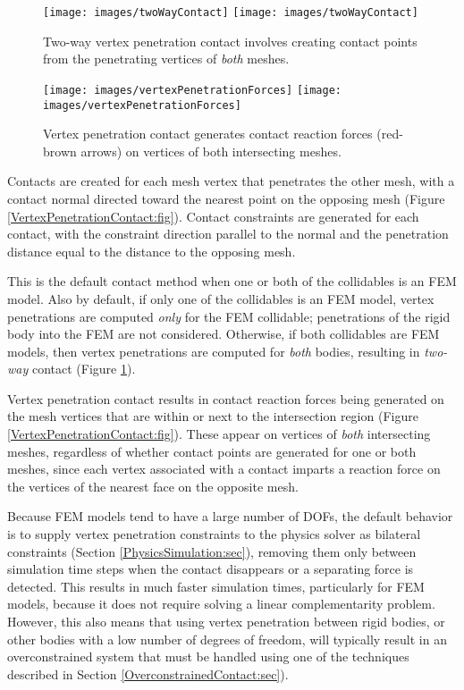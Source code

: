 \begin{figure}[ht]
\begin{center}
\iflatexml
 \texttt{[image: images/twoWayContact]}
\else
 \texttt{[image: images/twoWayContact]}
\fi
\end{center}
\caption{Two-way vertex penetration contact involves creating
contact points from the penetrating vertices of {\it both}
meshes.}
\label{TwoWayContact:fig}
\end{figure}

\begin{figure}[ht]
\begin{center}
\iflatexml
 \texttt{[image: images/vertexPenetrationForces]}
\else
 \texttt{[image: images/vertexPenetrationForces]}
\fi
\end{center}
\caption{Vertex penetration contact generates contact reaction forces
(red-brown arrows) on vertices of both intersecting meshes.}
\label{VertexPenetrationForces:fig}
\end{figure}

Contacts are created for each mesh vertex that penetrates the other
mesh, with a contact normal directed toward the nearest point on the
opposing mesh (Figure \ref{VertexPenetrationContact:fig}).  Contact
constraints are generated for each contact, with the constraint
direction parallel to the normal and the penetration distance equal to
the distance to the opposing mesh.

This is the default contact method when one or both of the
collidables is an FEM model. Also by default, if only one of the
collidables is an FEM model, vertex penetrations are computed {\it
only} for the FEM collidable; penetrations of the rigid body into the
FEM are not considered. Otherwise, if both collidables are FEM models,
then vertex penetrations are computed for {\it both} bodies, resulting
in {\it two-way} contact (Figure \ref{TwoWayContact:fig}).

Vertex penetration contact results in contact reaction forces being generated
on the mesh vertices that are within or next to the intersection region
(Figure \ref{VertexPenetrationContact:fig}).  These appear on vertices of {\it
both} intersecting meshes, regardless of whether contact points are generated
for one or both meshes, since each vertex associated with a contact imparts a
reaction force on the vertices of the nearest face on the opposite mesh.

Because FEM models tend to have a large number of DOFs, the default
behavior is to supply vertex penetration constraints to the physics
solver as bilateral constraints (Section \ref{PhysicsSimulation:sec}),
removing them only between simulation time steps when the contact
disappears or a separating force is detected. This results in much
faster simulation times, particularly for FEM models, because it does
not require solving a linear complementarity problem. However, this
also means that using vertex penetration between rigid bodies, or
other bodies with a low number of degrees of freedom, will typically
result in an overconstrained system that must be handled using one of
the techniques described in Section \ref{OverconstrainedContact:sec}).

